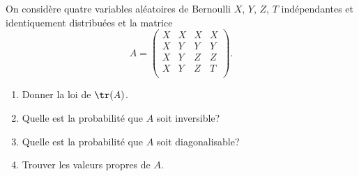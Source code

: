 \begin{enonce}
\begin{exercise}[ID={RMS130 E753},subtitle={Mines-Pont PSI 2019},tags={}, difficulty={0}]
On considère quatre variables aléatoires de Bernoulli $X$, $Y$, $Z$, $T$ indépendantes et identiquement distribuées et la matrice
\begin{equation*}
  A = 
  \begin{pmatrix}
    X&X&X&X\\
    X&Y&Y&Y\\
    X&Y&Z&Z\\
    X&Y&Z&T\\
  \end{pmatrix}.
\end{equation*}
\begin{enumerate}
  \item Donner la loi de $\tr(A)$.
  \item Quelle est la probabilité que $A$ soit inversible?
  \item Quelle est la probabilité que $A$ soit diagonalisable?
  \item Trouver les valeurs propres de $A$.
\end{enumerate}
\end{exercise}
\begin{solution}
\end{solution}
\end{enonce}
